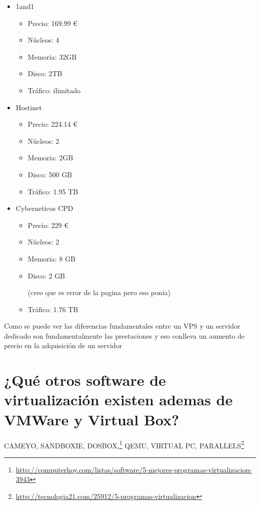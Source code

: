 \begin{itemize}
\item 1and1
	\begin{itemize}
	\item Precio: 169.99 \euro
	\item Núcleos: 4
	\item Memoria: 32GB
	\item Disco: 2TB
	\item Tráfico: ilimitado
	\end{itemize}
\item Hostinet
	\begin{itemize}
	\item Precio: 224.14 \euro
	\item Núcleos: 2
	\item Memoria: 2GB
	\item Disco: 500 GB
	\item Tráfico: 1.95 TB
	\end{itemize}

\item Cyberneticos CPD
	\begin{itemize}
	\item Precio: 229 \euro
	\item Núcleos: 2
	\item Memoria: 8 GB
	\item Disco: 2 GB \begin{tiny}
	(creo que es error de la pagina pero eso ponia)
	\end{tiny}
	\item Tráfico: 1.76 TB
	\end{itemize}
\end{itemize}
Como se puede ver las diferencias fundamentales entre un VPS y un servidor dedicado son fundamentalmente las prestaciones y eso conlleva un aumento de precio en la adquisición de un servidor 
\section{¿Qué otros software de virtualización existen ademas de VMWare y Virtual Box?}
CAMEYO, SANDBOXIE, DOSBOX,\footnote{\url{http://computerhoy.com/listas/software/5-mejores-programas-virtualizacion-3943}} QEMU, VIRTUAL PC, PARALLELS\footnote{\url{http://tecnologia21.com/25912/5-programas-virtualizacion}}
\newpage
